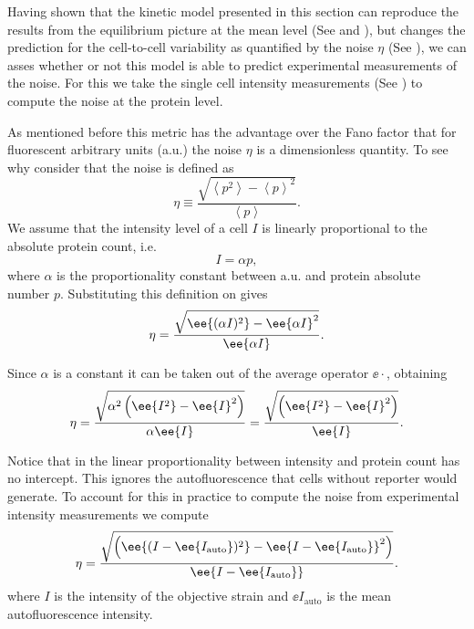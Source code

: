 Having shown that the kinetic model presented in this section can reproduce the
results from the equilibrium picture at the mean level (See
 and ), but changes the
prediction for the cell-to-cell variability as quantified by the noise $\eta$
(See ), we can asses whether or not this model is
able to predict experimental measurements of the noise. For this we take the
single cell intensity measurements (See ) to
compute the noise at the protein level.

As mentioned before this metric has the advantage over the Fano factor that for
fluorescent arbitrary units (a.u.) the noise $\eta$ is a dimensionless quantity.
To see why consider that the noise is defined as
\begin{equation}
\eta \equiv \frac{\sqrt{\left\langle p^2 \right\rangle -
                        \left\langle p \right\rangle^2}}
                        {\left\langle p \right\rangle}.
    \label{eq_noise_protein}
\end{equation}
We assume that the intensity level of a cell $I$ is linearly proportional to
the absolute protein count, i.e.
\begin{equation}
I = \alpha p,
\label{eq_calibration_factor}
\end{equation}
where $\alpha$ is the proportionality constant between a.u. and protein absolute
number $p$. Substituting this definition on  gives
\begin{equation}
  \eta = {\sqrt{\ee{(\alpha I)^2} - \ee{\alpha I}^2} \over
                \ee{\alpha I}}.
\end{equation}

Since $\alpha$ is a constant it can be taken out of the average operator
$\ee{\cdot}$, obtaining
\begin{equation}
  \eta = {\sqrt{\alpha^2 \left(\ee{I^2} -
                \ee{I}^2 \right)} \over
                \alpha \ee{I}}
       = {\sqrt{\left(\ee{I^2} - \ee{I}^2 \right)} \over
                \ee{I}}.
\end{equation}

Notice that in  the linear proportionality between
intensity and protein count has no intercept. This ignores the autofluorescence
that cells without reporter would generate. To account for this in practice to
compute the noise from experimental intensity measurements we compute
\begin{equation}
\eta = {\sqrt{\left(\ee{(I - \ee{I_\text{auto}})^2} -
                    \ee{I - \ee{I_\text{auto}}}^2 \right)} \over
                \ee{I - \ee{I_\text{auto}}}}.
\end{equation}
where $I$ is the intensity of the objective strain and $\ee{I_\text{auto}}$ is
the mean autofluorescence intensity.

